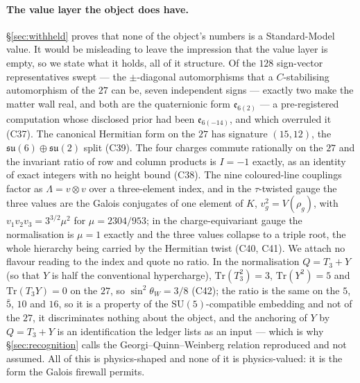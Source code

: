 \documentclass[11pt,a4paper]{article}
\theoremstyle{definition}
\theoremstyle{remark}
\begin{document}
\paragraph{The value layer the object does have.} \S\ref{sec:withheld} proves that none of the object's numbers is a
Standard-Model value. It would be misleading to leave the impression that the value layer is empty, so we state what it
holds, all of it structure. Of the $128$ sign-vector representatives swept --- the $\pm$-diagonal automorphisms that a $C$-stabilising automorphism of the $27$ can be, seven independent signs --- exactly two make the matter wall real, and both are the quaternionic
form $\mathfrak{e}_{6(2)}$ --- a pre-registered computation whose disclosed prior had been $\mathfrak{e}_{6(-14)}$, and which
overruled it (C37). The
canonical Hermitian form on the $27$ has signature $(15,12)$, the $\mathfrak{su}(6) \oplus \mathfrak{su}(2)$ split (C39).
The four charges commute rationally on the $27$ and the invariant ratio of row and column products is $I = -1$ exactly, as an
identity of exact integers with no height bound (C38). The nine coloured-line couplings factor as $\Lambda = v \otimes v$ over
a three-element index, and in the $\tau$-twisted gauge the three values are the Galois conjugates of one element of $K$,
$v_g^2 = V(\rho_g)$, with $v_1 v_2 v_3 = 3^{3/2}\mu^2$ for $\mu = 2304/953$; in the charge-equivariant gauge the
normalisation is $\mu = 1$ exactly and the three values collapse to a triple root, the whole hierarchy being carried by the
Hermitian twist (C40, C41). We attach no flavour reading to the index and quote no ratio. In the normalisation
$Q = T_3 + Y$ (so that $Y$ is half the conventional hypercharge), $\mathrm{Tr}(T_3^2) = 3$, $\mathrm{Tr}(Y^2) = 5$ and
$\mathrm{Tr}(T_3 Y) = 0$ on the $27$, so $\sin^2\theta_W = 3/8$ (C42); the ratio is the same on the $5$, $\bar 5$, $10$ and
$16$, so it is a property of the $\mathrm{SU}(5)$-compatible embedding and not of the $27$, it discriminates nothing about the
object, and the anchoring of $Y$ by $Q = T_3 + Y$ is an identification the ledger lists as an input --- which is why
\S\ref{sec:recognition} calls the Georgi--Quinn--Weinberg relation reproduced and not assumed. All of this is physics-shaped and none of it is
physics-valued: it is the form the Galois firewall permits.
\end{document}
